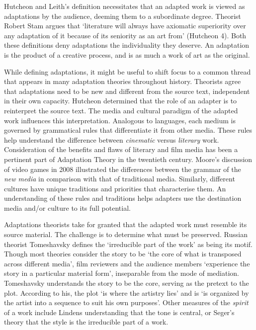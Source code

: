 \documentclass[12pt]{article}
\begin{document}
Hutcheon and Leith's definition necessitates that an adapted work is
viewed as adaptations by the audience, deeming them to a subordinate
degree. Theorist Robert Stam argues that `literature will always have axiomatic
superiority over any adaptation of it because of its seniority as an art from'
(Hutcheon 4). Both these definitions deny adaptations the individuality
they deserve. An adaptation is the product of a 
creative process, and is as much a work of art as the original. 

While defining adaptations, it might be useful to shift focus to a common thread that
appears in many adaptation theories throughout history. Theorists agree that adaptations 
need to be new and different from the source
text, independent in their own capacity. Hutcheon determined that the role of an adapter is to 
reinterpret the source text. The media and cultural paradigm of the adapted 
work influences this interpretation. Analogous to languages, each medium is
governed by grammatical rules that differentiate it from other media. These
rules help understand the difference between \textit{cinematic} versus
\textit{literary} work. Consideration of the benefits and flaws of literary and
film media has been a pertinent part of Adaptation Theory in the twentieth century.
Moore's discussion of video games in 2008 illustrated the differences between
the grammar of the \textit{new media} in comparison with that of traditional media. 
Similarly, different cultures have unique traditions and priorities
that characterise them. An understanding of these rules and traditions helps 
adapters use the destination media and/or culture to its full potential. 

Adaptations theorists take for granted that the adapted work must resemble its
source material. The challenge is to determine what must be preserved. Russian
theorist Tomeshavsky defines the `irreducible part of the work' as being its
motif. Though most theories consider the story to be `the core of what is transposed
across different media', film reviewers and the audience members `experience the
story in a particular material form', inseparable from the mode of mediation.
Tomeshavsky understands the story to be the core, serving as the pretext to the
plot. According to his, the plot `is where the artistry lies' and is 
`is organized by the artist into a sequence to suit
   his own purposes'. Other measures of the \textit{spirit} of a work include
   Lindens understanding that the tone is central, or Seger's theory that
   the style is the irreducible part of a work.
\end{document}
